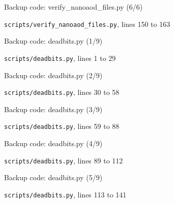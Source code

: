\begin{frame}{Backup code: verify\_nanoaod\_files.py (6/6)}
  \vspace{0pt}\par
  {\tiny\color{lightgrey}\texttt{scripts/verify\_nanoaod\_files.py}, lines 150 to 163\par}
  
\end{frame}
\begin{frame}{Backup code: deadbits.py (1/9)}
  \vspace{0pt}\par
  {\tiny\color{lightgrey}\texttt{scripts/deadbits.py}, lines 1 to 29\par}
  
\end{frame}
\begin{frame}{Backup code: deadbits.py (2/9)}
  \vspace{0pt}\par
  {\tiny\color{lightgrey}\texttt{scripts/deadbits.py}, lines 30 to 58\par}
  
\end{frame}
\begin{frame}{Backup code: deadbits.py (3/9)}
  \vspace{0pt}\par
  {\tiny\color{lightgrey}\texttt{scripts/deadbits.py}, lines 59 to 88\par}
  
\end{frame}
\begin{frame}{Backup code: deadbits.py (4/9)}
  \vspace{0pt}\par
  {\tiny\color{lightgrey}\texttt{scripts/deadbits.py}, lines 89 to 112\par}
  
\end{frame}
\begin{frame}{Backup code: deadbits.py (5/9)}
  \vspace{0pt}\par
  {\tiny\color{lightgrey}\texttt{scripts/deadbits.py}, lines 113 to 141\par}
  
\end{frame}
